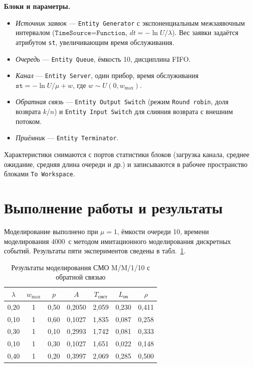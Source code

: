 \documentclass[a4paper,14pt,oneside,openany]{memoir}
\begin{document}
\textbf{Блоки и параметры.}
\begin{itemize}
    \item \textit{Источник заявок} --- \texttt{Entity Generator} с экспоненциальным межзаявочным интервалом ($\texttt{TimeSource=Function}$, $dt=-\ln U/\lambda$). Вес заявки задаётся атрибутом \texttt{st}, увеличивающим время обслуживания.
    \item \textit{Очередь} --- \texttt{Entity Queue}, ёмкость 10, дисциплина FIFO.
    \item \textit{Канал} --- \texttt{Entity Server}, один прибор, время обслуживания $\texttt{st}=-\ln U/\mu + w$, где $w\sim U(0,w_{\max})$.
    \item \textit{Обратная связь} --- \texttt{Entity Output Switch} (режим \texttt{Round robin}, доля возврата $k/n$) и \texttt{Entity Input Switch} для слияния возврата с внешним потоком.
    \item \textit{Приёмник} --- \texttt{Entity Terminator}.
\end{itemize}

Характеристики снимаются с портов статистики блоков (загрузка канала, среднее ожидание, средняя длина очереди и др.) и записываются в рабочее пространство блоками \texttt{To Workspace}.

\section{Выполнение работы и результаты}

Моделирование выполнено при $\mu=1$, ёмкости очереди 10, времени моделирования 4000~с методом имитационного моделирования дискретных событий. Результаты пяти экспериментов сведены в табл.~\ref{tab:lab9_results}.

\begin{table}[H]
\caption{Результаты моделирования СМО M/M/1/10 с обратной связью}
\label{tab:lab9_results}
\centering
\begin{tabular}{|c|c|c||c|c|c|c|}
\hline
$\lambda$ & $w_{\max}$ & $p$ & $A$ & $T_\text{сист}$ & $L_\text{оч}$ & $\rho$ \\ \hline
0,20 & 1 & 0,50 & 0,2050 & 2,059 & 0,230 & 0,411 \\ \hline
0,10 & 1 & 0,60 & 0,1027 & 1,835 & 0,087 & 0,258 \\ \hline
0,30 & 1 & 0,10 & 0,2993 & 1,742 & 0,081 & 0,333 \\ \hline
0,10 & 1 & 0,30 & 0,1027 & 1,651 & 0,022 & 0,148 \\ \hline
0,40 & 1 & 0,20 & 0,3997 & 2,069 & 0,285 & 0,500 \\ \hline
\end{tabular}
\end{table}
\end{document}
